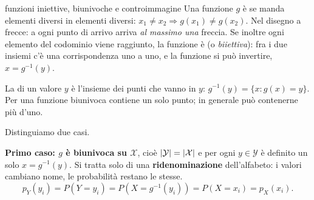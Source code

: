 \begin{richiamo}{funzioni iniettive, biunivoche e controimmagine}
Una funzione $g$ è  se manda elementi diversi in elementi diversi: $x_1 \neq x_2 \Rightarrow
g(x_1) \neq g(x_2)$. Nel disegno a frecce: a ogni punto di arrivo arriva \emph{al massimo una} freccia. Se inoltre
ogni elemento del codominio viene raggiunto, la funzione è  (o \emph{biiettiva}): fra i due insiemi
c'è una corrispondenza uno a uno, e la funzione si può invertire, $x = g^{-1}(y)$.

La  di un valore $y$ è l'insieme dei punti che vanno in $y$:
$g^{-1}(y) = \{x : g(x) = y\}$. Per una funzione biunivoca contiene un solo punto; in generale può contenerne più
d'uno.
\begin{center}
\end{center}
\end{richiamo}

Distinguiamo due casi.

\textbf{Primo caso: $g$ è biunivoca su $\mathcal{X}$}, cioè $\left\lvert \mathcal{Y} \right\rvert = \left\lvert \mathcal{X} \right\rvert$ e per ogni
$y \in \mathcal{Y}$ è definito un solo $x = g^{-1}(y)$. Si tratta solo di una \textbf{ridenominazione}
dell'alfabeto: i valori cambiano nome, le probabilità restano le stesse.
\[ p_Y(y_i) = P(Y = y_i) = P\left(X = g^{-1}(y_i)\right) = P(X = x_i) = p_X(x_i) . \]

